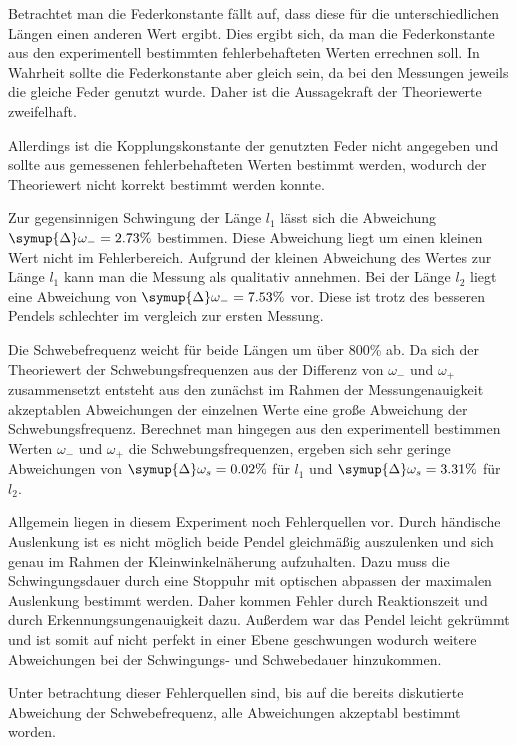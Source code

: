 Betrachtet man die Federkonstante fällt auf, dass diese für die unterschiedlichen Längen einen anderen Wert ergibt. Dies ergibt sich, da man die Federkonstante aus den experimentell
bestimmten fehlerbehafteten Werten errechnen soll. In Wahrheit sollte die Federkonstante aber gleich sein, da bei den Messungen jeweils die gleiche Feder genutzt wurde. Daher ist die 
Aussagekraft der Theoriewerte zweifelhaft.


Allerdings ist die Kopplungskonstante der genutzten Feder nicht angegeben und sollte aus gemessenen fehlerbehafteten Werten bestimmt werden, wodurch der Theoriewert nicht korrekt bestimmt 
werden konnte.

Zur gegensinnigen Schwingung der Länge $l_1$ lässt sich die Abweichung $\symup{\Delta}\omega_{-} = 2.73\%$ bestimmen. Diese Abweichung liegt um einen kleinen Wert nicht im Fehlerbereich.
Aufgrund der kleinen Abweichung des Wertes zur Länge $l_1$ kann man die Messung als qualitativ annehmen. Bei der Länge $l_2$ liegt eine Abweichung von $\symup{\Delta}\omega_{-} = 7.53\%$
vor. Diese ist trotz des besseren Pendels schlechter im vergleich zur ersten Messung.

Die Schwebefrequenz weicht für beide Längen um über 800\% ab. Da sich der Theoriewert der Schwebungsfrequenzen aus der Differenz von $\omega_-$ und $\omega_+$ zusammensetzt entsteht 
aus den zunächst im Rahmen der Messungenauigkeit akzeptablen Abweichungen der einzelnen Werte eine große Abweichung der Schwebungsfrequenz. Berechnet man hingegen aus den experimentell
bestimmen Werten $\omega_-$ und $\omega_+$ die Schwebungsfrequenzen, ergeben sich sehr geringe Abweichungen von $\symup{\Delta}\omega_{s} = 0.02\%$ für $l_1$ und $\symup{\Delta}\omega_{s} = 3.31\%$ 
für $l_2$. 


Allgemein liegen in diesem Experiment noch Fehlerquellen vor. Durch händische Auslenkung ist es nicht möglich beide Pendel gleichmäßig auszulenken und sich genau im Rahmen der
Kleinwinkelnäherung aufzuhalten. Dazu muss die Schwingungsdauer durch eine Stoppuhr mit optischen abpassen der maximalen Auslenkung bestimmt werden. Daher kommen Fehler durch 
Reaktionszeit und durch Erkennungsungenauigkeit dazu. Außerdem war das Pendel leicht gekrümmt und ist somit auf nicht perfekt in einer Ebene geschwungen wodurch weitere Abweichungen 
bei der Schwingungs- und Schwebedauer hinzukommen.


Unter betrachtung dieser Fehlerquellen sind, bis auf die bereits diskutierte Abweichung der Schwebefrequenz, alle Abweichungen akzeptabl bestimmt worden.  


